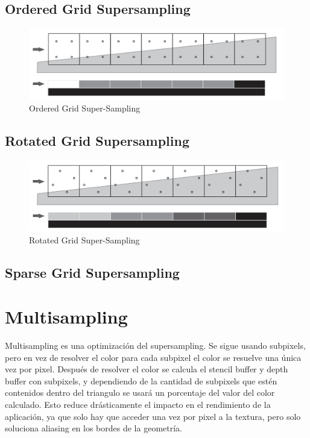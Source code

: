 \documentclass[withindex, glossary]{cam-thesis}
\begin{document}
\subsection{Ordered Grid Supersampling}

\begin{figure}
    \includegraphics[width=\linewidth]{figures/ogss.png}
    \caption{Ordered Grid Super-Sampling\cite{Beets2000SupersamplingAA}}
\end{figure}

\subsection{Rotated Grid Supersampling}

\begin{figure}
    \includegraphics[width=\linewidth]{figures/rgss.png}
    \caption{Rotated Grid Super-Sampling\cite{Beets2000SupersamplingAA}}
\end{figure}

\subsection{Sparse Grid Supersampling}

\section{Multisampling}

Multisampling es una optimización del supersampling. Se sigue usando subpixels, pero en vez de resolver el color para cada subpixel el color se resuelve una única vez por pixel. Después de resolver el color se calcula el stencil buffer y depth buffer con subpixels, y dependiendo de la cantidad de subpixels que estén contenidos dentro del triangulo se usará un porcentaje del valor del color calculado. Esto reduce drásticamente el impacto en el rendimiento de la aplicación, ya que solo hay que acceder una vez por pixel a la textura, pero solo soluciona aliasing en los bordes de la geometría.
\end{document}

